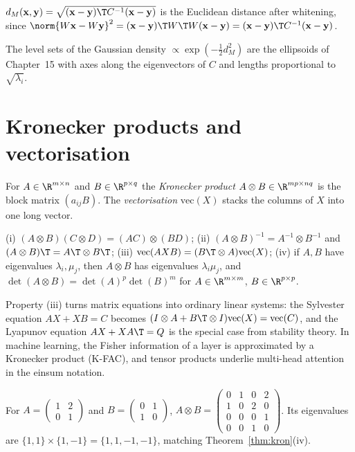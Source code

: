 \begin{definition}
$d_M(\mathbf{x},\mathbf{y})=\sqrt{(\mathbf{x}-\mathbf{y})\T C^{-1}(\mathbf{x}-\mathbf{y})}$ is the Euclidean distance after whitening, since $\norm{W\mathbf{x}-W\mathbf{y}}^2=(\mathbf{x}-\mathbf{y})\T W\T W(\mathbf{x}-\mathbf{y})=(\mathbf{x}-\mathbf{y})\T C^{-1}(\mathbf{x}-\mathbf{y})$.
\end{definition}

The level sets of the Gaussian density $\propto\exp(-\tfrac12d_M^2)$ are the ellipsoids of Chapter~15 with axes along the eigenvectors of $C$ and lengths proportional to $\sqrt{\lambda_i}$.

\section{Kronecker products and vectorisation}

\begin{definition}
For $A\in\R^{m\times n}$ and $B\in\R^{p\times q}$ the \emph{Kronecker product} $A\otimes B\in\R^{mp\times nq}$ is the block matrix $(a_{ij}B)$. The \emph{vectorisation} $\mathrm{vec}(X)$ stacks the columns of $X$ into one long vector.
\end{definition}

\begin{theorem}[Rules]\label{thm:kron}
(i) $(A\otimes B)(C\otimes D)=(AC)\otimes(BD)$; (ii) $(A\otimes B)^{-1}=A^{-1}\otimes B^{-1}$ and $(A\otimes B)\T=A\T\otimes B\T$; (iii) $\mathrm{vec}(AXB)=(B\T\otimes A)\mathrm{vec}(X)$; (iv) if $A,B$ have eigenvalues $\lambda_i,\mu_j$, then $A\otimes B$ has eigenvalues $\lambda_i\mu_j$, and $\det(A\otimes B)=\det(A)^p\det(B)^m$ for $A\in\R^{m\times m}$, $B\in\R^{p\times p}$.
\end{theorem}

Property (iii) turns matrix equations into ordinary linear systems: the Sylvester equation $AX+XB=C$ becomes $(I\otimes A+B\T\otimes I)\mathrm{vec}(X)=\mathrm{vec}(C)$, and the Lyapunov equation $AX+XA\T=Q$ is the special case from stability theory. In machine learning, the Fisher information of a layer is approximated by a Kronecker product (K-FAC), and tensor products underlie multi-head attention in the einsum notation.

\begin{example}
For $A=\begin{pmatrix}1&2\\0&1\end{pmatrix}$ and $B=\begin{pmatrix}0&1\\1&0\end{pmatrix}$, $A\otimes B=\begin{pmatrix}0&1&0&2\\1&0&2&0\\0&0&0&1\\0&0&1&0\end{pmatrix}$. Its eigenvalues are $\{1,1\}\times\{1,-1\}=\{1,1,-1,-1\}$, matching Theorem~\ref{thm:kron}(iv).
\end{example}

